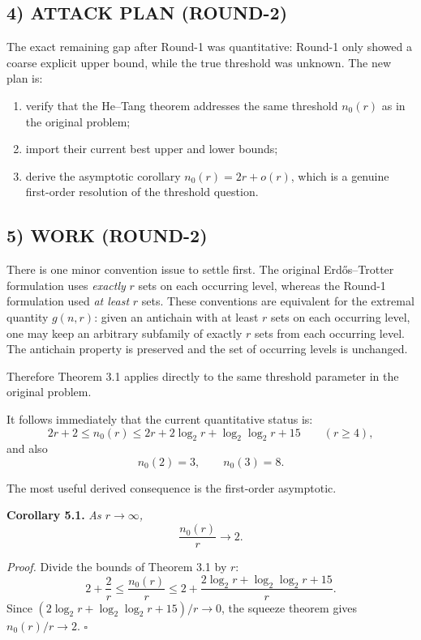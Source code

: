 \subsection*{4) ATTACK PLAN (ROUND-2)}
The exact remaining gap after Round-1 was quantitative: Round-1 only showed a coarse explicit upper bound, while the true threshold was unknown. The new plan is:

\begin{enumerate}
\item verify that the He--Tang theorem addresses the same threshold $n_0(r)$ as in the original problem;
\item import their current best upper and lower bounds;
\item derive the asymptotic corollary $n_0(r)=2r+o(r)$, which is a genuine first-order resolution of the threshold question.
\end{enumerate}

\subsection*{5) WORK (ROUND-2)}
There is one minor convention issue to settle first. The original Erd\H{o}s--Trotter formulation uses \emph{exactly} $r$ sets on each occurring level, whereas the Round-1 formulation used \emph{at least} $r$ sets. These conventions are equivalent for the extremal quantity $g(n,r)$: given an antichain with at least $r$ sets on each occurring level, one may keep an arbitrary subfamily of exactly $r$ sets from each occurring level. The antichain property is preserved and the set of occurring levels is unchanged.

Therefore Theorem 3.1 applies directly to the same threshold parameter in the original problem.

It follows immediately that the current quantitative status is:
\[
2r+2\le n_0(r)\le 2r+2\log_2 r+\log_2\log_2 r+15 \qquad (r\ge 4),
\]
and also
\[
 n_0(2)=3,\qquad n_0(3)=8.
\]

The most useful derived consequence is the first-order asymptotic.

\medskip
\noindent\textbf{Corollary 5.1.} \emph{As $r\to\infty$,}
\[
\frac{n_0(r)}{r}\to 2.
\]

\medskip
\noindent\emph{Proof.} Divide the bounds of Theorem 3.1 by $r$:
\[
2+\frac{2}{r}\le \frac{n_0(r)}{r}\le 2+\frac{2\log_2 r+\log_2\log_2 r+15}{r}.
\]
Since $(2\log_2 r+\log_2\log_2 r+15)/r\to 0$, the squeeze theorem gives $n_0(r)/r\to 2$. \hfill$\square$


